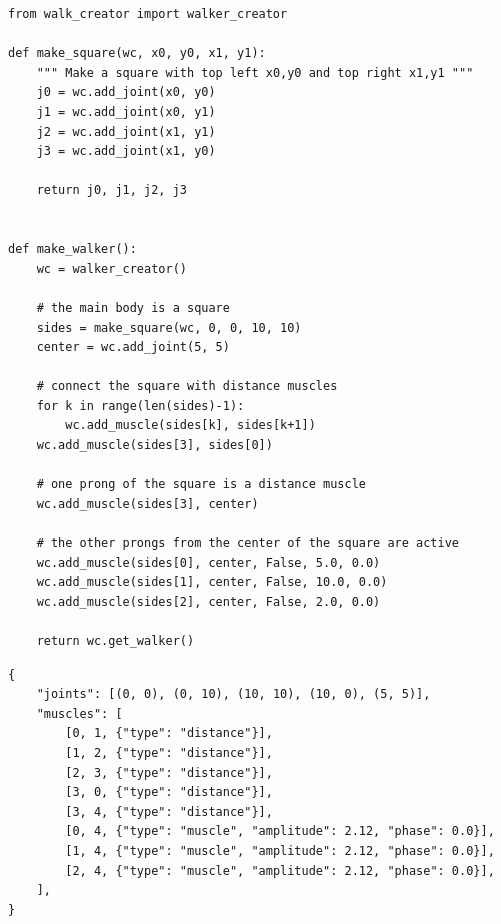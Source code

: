 \documentclass{article}
\begin{document}
\begin{listing}[!ht]
\begin{verbatim}
from walk_creator import walker_creator

def make_square(wc, x0, y0, x1, y1):
    """ Make a square with top left x0,y0 and top right x1,y1 """
    j0 = wc.add_joint(x0, y0)
    j1 = wc.add_joint(x0, y1)
    j2 = wc.add_joint(x1, y1)
    j3 = wc.add_joint(x1, y0)

    return j0, j1, j2, j3


def make_walker():
    wc = walker_creator()

    # the main body is a square
    sides = make_square(wc, 0, 0, 10, 10)
    center = wc.add_joint(5, 5)

    # connect the square with distance muscles
    for k in range(len(sides)-1):
        wc.add_muscle(sides[k], sides[k+1])
    wc.add_muscle(sides[3], sides[0])

    # one prong of the square is a distance muscle
    wc.add_muscle(sides[3], center)

    # the other prongs from the center of the square are active
    wc.add_muscle(sides[0], center, False, 5.0, 0.0)
    wc.add_muscle(sides[1], center, False, 10.0, 0.0)
    wc.add_muscle(sides[2], center, False, 2.0, 0.0)

    return wc.get_walker()
\end{verbatim}
\caption{Example Sodaracer-generating program.}
\label{listing:1}
\end{listing}

\begin{listing}[!ht]
\begin{verbatim}
{
    "joints": [(0, 0), (0, 10), (10, 10), (10, 0), (5, 5)],
    "muscles": [
        [0, 1, {"type": "distance"}],
        [1, 2, {"type": "distance"}],
        [2, 3, {"type": "distance"}],
        [3, 0, {"type": "distance"}],
        [3, 4, {"type": "distance"}],
        [0, 4, {"type": "muscle", "amplitude": 2.12, "phase": 0.0}],
        [1, 4, {"type": "muscle", "amplitude": 2.12, "phase": 0.0}],
        [2, 4, {"type": "muscle", "amplitude": 2.12, "phase": 0.0}],
    ],
}
\end{verbatim}
\caption{Intermediate Sodaracer representation from running the above Python seed program.}
\label{listing:2}
\end{listing}
\end{document}
